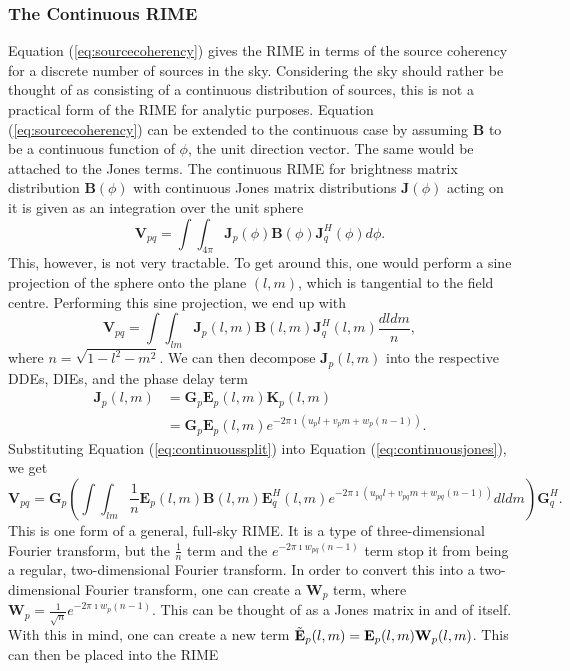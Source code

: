 \documentclass{article}
\begin{document}
\subsubsection{The Continuous RIME}
Equation (\ref{eq:sourcecoherency}) gives the RIME in terms of the source coherency for a discrete number of sources in the sky. Considering the sky should rather be thought of as consisting of a continuous distribution of sources, this is not a practical form of the RIME for analytic purposes. Equation (\ref{eq:sourcecoherency}) can be extended to the continuous case by assuming $\mathbf{B}$ to be a continuous function of $\phi$, the unit direction vector. The same would be attached to the Jones terms. The continuous RIME for brightness matrix distribution $\mathbf{B}(\phi)$ with continuous Jones matrix distributions $\mathbf{J}(\phi)$ acting on it is given as an integration over the unit sphere
\begin{equation}
\mathbf{V}_{pq} = \int \int_{4\pi} \mathbf{J}_p(\phi) \mathbf{B}(\phi) \mathbf{J}^H_q(\phi) d\phi .
\end{equation}
This, however, is not very tractable. To get around this, one would perform a sine projection of the sphere onto the plane $(l,m)$, which is tangential to the field centre. Performing this sine projection, we end up with
\begin{equation}
\label{eq:continuousjones}
\mathbf{V}_{pq} = \int \int _{lm} \mathbf{J}_p(l, m) \mathbf{B}(l, m) \mathbf{J}^H_q(l, m) \frac{dldm}{n} ,
\end{equation}
where $n = \sqrt{1 - l^2 - m^2}$. We can then decompose $\mathbf{J}_p(l, m)$ into the respective DDEs, DIEs, and the phase delay term
\begin{align}
\mathbf{J}_p(l, m) &= \mathbf{G}_p \mathbf{E}_p(l, m) \mathbf{K}_p(l, m) \\
&= \mathbf{G}_p \mathbf{E}_p(l, m) e^{-2 \pi \imath (u_pl + v_pm + w_p(n-1))} .
\label{eq:continuoussplit}
\end{align}
Substituting Equation (\ref{eq:continuoussplit}) into Equation (\ref{eq:continuousjones}), we get
\begin{equation}
\mathbf{V}_{pq} = \mathbf{G}_p (\int \int_{lm} \frac{1}{n} \mathbf{E}_p(l, m) \mathbf{B}(l,m) \mathbf{E}^H_q(l, m) e^{-2 \pi \imath (u_{pq}l + v_{pq}m + w_{pq}(n-1))} dldm) \mathbf{G}^H_q .
\end{equation}
This is one form of a general, full-sky RIME. It is a type of three-dimensional Fourier transform, but the $\frac{1}{n}$ term and the $e^{-2 \pi \imath w_{pq}(n-1)}$ term stop it from being a regular, two-dimensional Fourier transform. In order to convert this into a two-dimensional Fourier transform, one can create a $\mathbf{W}_p$ term, where $\mathbf{W}_p = \frac{1}{\sqrt{n}} e^{-2 \pi \imath w_{p}(n-1)}$. This can be thought of as a Jones matrix in and of itself. With this in mind, one can create a new term $\Tilde{\mathbf{E}}_{p}(l,m) = \mathbf{E}_p(l, m) \mathbf{W}_p(l, m)$. This can then be placed into the RIME
\end{document}
